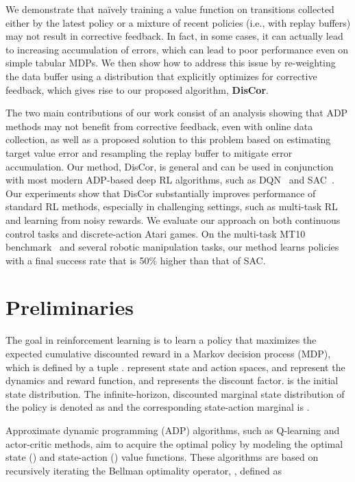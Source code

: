 \documentclass[jmlr]{article}
\begin{document}
We demonstrate that na\"ively training a value function on transitions collected either by the latest policy or a mixture of recent policies (i.e., with replay buffers) may not result in corrective feedback. In fact, in some cases, it can actually lead to increasing accumulation of errors, which can lead to poor performance even on simple tabular MDPs.
We then show how to address this issue by re-weighting the data buffer using a distribution that explicitly optimizes for corrective feedback, which gives rise to our proposed algorithm, \textbf{DisCor}. 


The two main contributions of our work consist of an analysis showing that ADP methods may not benefit from corrective feedback, even with online data collection, as well as a proposed solution to this problem based on estimating target value error and resampling the replay buffer to mitigate error accumulation.
Our method, DisCor, is general and can be used in conjunction with most modern ADP-based deep RL algorithms, such as DQN~\citep{Mnih2015} and SAC~\citep{Haarnoja18}. Our experiments show that DisCor substantially improves performance of standard RL methods, especially in challenging settings, such as multi-task RL and learning from noisy rewards. We evaluate our approach on both continuous control tasks and discrete-action Atari games.
On the multi-task MT10 benchmark~\citep{yu2019meta} and several robotic manipulation tasks, our method learns policies with a final success rate that is 50\% higher than that of SAC.

 \section{Preliminaries}
\label{sec:backrgound}
{The goal in reinforcement learning is to learn a policy that maximizes the expected cumulative discounted reward in a Markov decision process (MDP), which is defined by a tuple} .  represent state and action spaces,  and  represent the dynamics and reward function, and  represents the discount factor.  is the initial state distribution. The infinite-horizon, {discounted marginal state distribution of the policy  is denoted as  and the  corresponding state-action marginal is .}

Approximate dynamic programming (ADP) algorithms, such as Q-learning and actor-critic methods, aim to acquire the optimal policy by modeling the optimal state () and state-action () value functions. These algorithms are based on recursively iterating the Bellman optimality operator, , defined as
\end{document}
